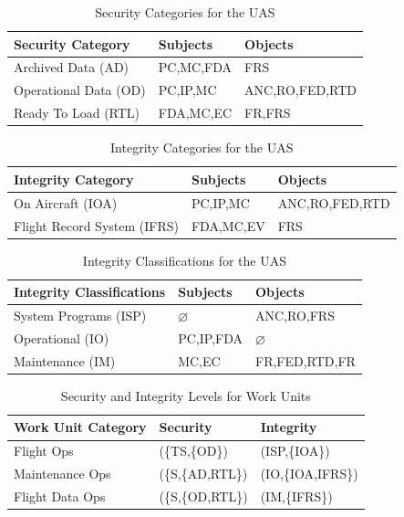 \documentclass[10pt,journal,compsoc]{IEEEtran}
\begin{document}
\begin{table}[]
  \caption{Security Categories for the UAS}
  \label{tab:security-categories}
  \centering
  \begin{tabular}{lll}
  \hline
  \textbf{Security Category} & \textbf{Subjects} & \textbf{Objects} \\
  \hline
  Archived Data (AD)         & PC,MC,FDA         & FRS              \\
  Operational Data (OD)      & PC,IP,MC          & ANC,RO,FED,RTD   \\
  Ready To Load (RTL)        & FDA,MC,EC         & FR,FRS    
  \end{tabular}
\end{table}

\begin{table}[]
  \caption{Integrity Categories for the UAS}
  \label{tab:integrity-categories}
  \centering
  \begin{tabular}{lll}
  \hline
  \textbf{Integrity Category} & \textbf{Subjects} & \textbf{Objects}  \\
  \hline
  On Aircraft (IOA)            & PC,IP,MC        & ANC,RO,FED,RTD \\
  Flight Record System (IFRS)  & FDA,MC,EV       & FRS        
  \end{tabular}
\end{table}

\begin{table}[]
  \caption{Integrity Classifications for the UAS}
  \label{tab:integrity-classifications}
  \centering
  \begin{tabular}{lll}
  \hline
  \textbf{Integrity Classifications} & \textbf{Subjects} & \textbf{Objects} \\
  \hline
  System Programs (ISP)                  & $\varnothing$    & ANC,RO,FRS     \\
  Operational (IO)                       & PC,IP,FDA        & $\varnothing$  \\
  Maintenance (IM)                       & MC,EC            & FR,FED,RTD,FR      
  \end{tabular}
\end{table}

\begin{table}[]
  \caption{Security and Integrity Levels for Work Units}
  \label{tab:security-integrity-work-units}
  \centering
  \begin{tabular}{lll}
  \hline
  \textbf{Work Unit Category} & \textbf{Security} & \textbf{Integrity} \\
  \hline
  Flight Ops                  & (\{TS,\{OD\})    & (ISP,\{IOA\})      \\
  Maintenance Ops             & (\{S,\{AD,RTL\}) & (IO,\{IOA,IFRS\})  \\
  Flight Data Ops             & (\{S,\{OD,RTL\}) & (IM,\{IFRS\})      
  \end{tabular}
\end{table}
\end{document}
